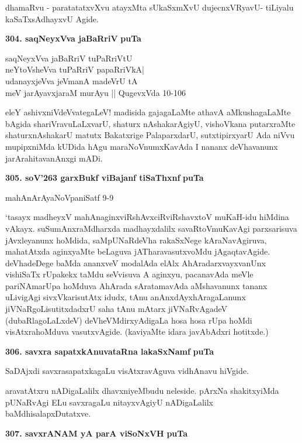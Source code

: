 {\smallskip
dhamaRvu - paratatatxvXvu atayxMta sUkaSxmXvU dujecnxVRyavU- tiLiyalu kaSaTxsAdhayxvU Agide.

\medskip
\noindent
\textbf{304. saqNeyxVva jaBaRriV} \hfill {\bf puTa \pageref{page113}}

\begin{shloka}
saqNeyxVva jaBaRriV tuPaRriVtU\\
neYtoVsheVva tuPaRriV papaRriVkA|\\
udanayxjeVva jeVmanA madeVrU tA\\
meV jarAyavxjaraM murAyu || \hfill{QugevxVda 10-106}
\end{shloka}

eleY ashivxniVdeVvategaLeV! madisida gajagaLaMte athavA aMkushagaLaMte bAgida shariVravuLaLxvarU, shaturx nAshakarAgiyU, vishoVkana putarxraMte shaturxnAshakarU matutx Bakatxrige PalaparxdarU, sutxtipirxyarU  Ada niVvu mupipxniMda kUDida hAgu maraNoVnumxKavAda I nananx deVhavanunx jarArahitavanAnxgi mADi.

\medskip
\noindent
\textbf{305. soV\char'263 garxBukf viBajanf tiSaThxnf} \hfill {\bf puTa \pageref{239}}

\hfill mahAnArAyaNoVpaniSatf 9-9

\smallskip
`tasayx madheyxV mahAnaginxviRshAvxciRviRshavxtoV muKaH-idu hiMdina vAkayx. suSumAnxraMdharxda madhayx\-dalilx savaRtoVmuKavAgi parxsarisuva jAvxleyanunx hoMdida, saMpUNaRdeVha rakaSxNege kAraNavAgiruva, maha\-tAtxda aginxyaMte beLaguva jATharavasutxvoMdu jAgaqtavAgide. deVhadeDege baMda ananxveV moda\-lAda elAlx AhAradarxvayxvanUnx vishiSaTx rUpakekx taMdu seVvisuva A aginxyu, pacanavAda meVle pari\-NAma\-rUpa hoMduva AhArada sAratamavAda aMshavanunx tananx uLivigAgi sivxVkarisutAtx idudx, tAnu anAnxdAyxhAragaLanunx jiVNaRgoLisutitxdadxrU saha tAnu mAtarx jiVNaRvAgadeV (dubaRlagoLaLxdeV) deV\-heVMdirxyAdigaLa hosa hosa rUpa hoMdi visAtxrahoMduva vasutxvAgide. (kaviyaMte idara javA\-bAdxri hotitxde.)

\medskip
\noindent
\textbf{306. savxra sapatxkAnuvataRna lakaSxNamf} \hfill {\bf puTa \pageref{160}}

\smallskip
SaDAjxdi savxrasapatxkagaLu visAtxravAguva vidhAnavu hiVgide.

aravatAtxru nADigaLalilx dhavxniyeMbudu neleside. pArxNa shakitxyiMda pUNaRvAgi ELu savxragaLu nitayx\-vAgiyU nADigaLalilx baMdhisalapxDutatxve.

\eject

\textbf{307. savxrANAM yA parA viSoNxVH} \hfill {\bf puTa \pageref{152}}

}
